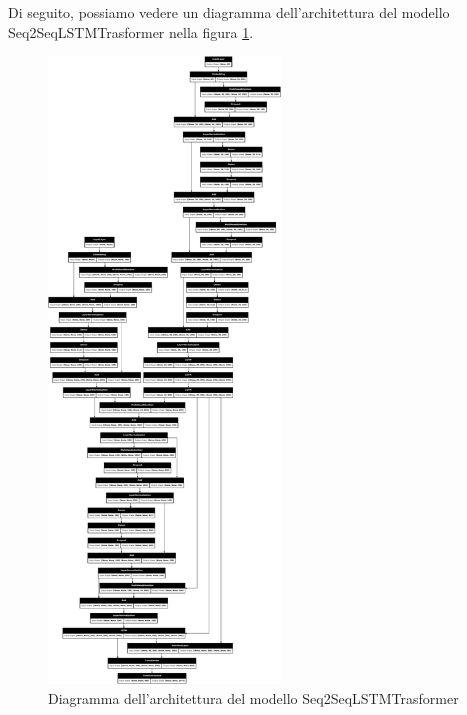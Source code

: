 Di seguito, possiamo vedere un diagramma dell'architettura del modello Seq2SeqLSTMTrasformer nella figura \ref{fig:seq2seqlstmtrasformer_model_architecture}.
\begin{figure}[H]
    \centering
    \includegraphics[width=0.55\textwidth]{media/Seq2SeqLSTMTransformer_image.png}
    \caption{Diagramma dell'architettura del modello Seq2SeqLSTMTrasformer}
    \label{fig:seq2seqlstmtrasformer_model_architecture}
\end{figure}


